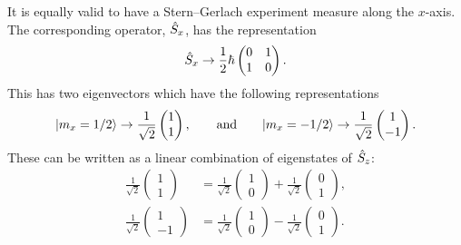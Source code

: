    It is equally valid to have a Stern--Gerlach experiment measure along the \(x\)-axis.
    The corresponding operator, \(\hat{S}_x\), has the representation
    \[
        \hat{S}_x \mathrel{\rightarrow} \frac{1}{2}\hbar
        \begin{pmatrix}
            0 & 1\\
            1 & 0
        \end{pmatrix}
        .
    \]
    This has two eigenvectors which have the following representations
    \[
        \vert {m_x = 1/2} \rangle \mathrel{\rightarrow} \frac{1}{\sqrt{2}}
        \begin{pmatrix}
            1 \\ 1
        \end{pmatrix}
        ,\qquad\text{and}\qquad \vert {m_x = -1/2} \rangle \mathrel{\rightarrow} \frac{1}{\sqrt{2}}
        \begin{pmatrix}
            1 \\ -1
        \end{pmatrix}
        .
    \]
    These can be written as a linear combination of eigenstates of \(\hat{S}_z\):
    \begin{align*}
        \frac{1}{\sqrt{2}} 
        \begin{pmatrix}
            1 \\ 1
        \end{pmatrix}
        &= \frac{1}{\sqrt{2}}
        \begin{pmatrix}
            1 \\ 0
        \end{pmatrix}
        + \frac{1}{\sqrt{2}}
        \begin{pmatrix}
            0 \\ 1
        \end{pmatrix}
        ,\\
        \frac{1}{\sqrt{2}} 
        \begin{pmatrix}
            1 \\ -1
        \end{pmatrix}
        &= \frac{1}{\sqrt{2}}
        \begin{pmatrix}
            1 \\ 0
        \end{pmatrix}
        - \frac{1}{\sqrt{2}}
        \begin{pmatrix}
            0 \\ 1
        \end{pmatrix}
        .
    \end{align*}
